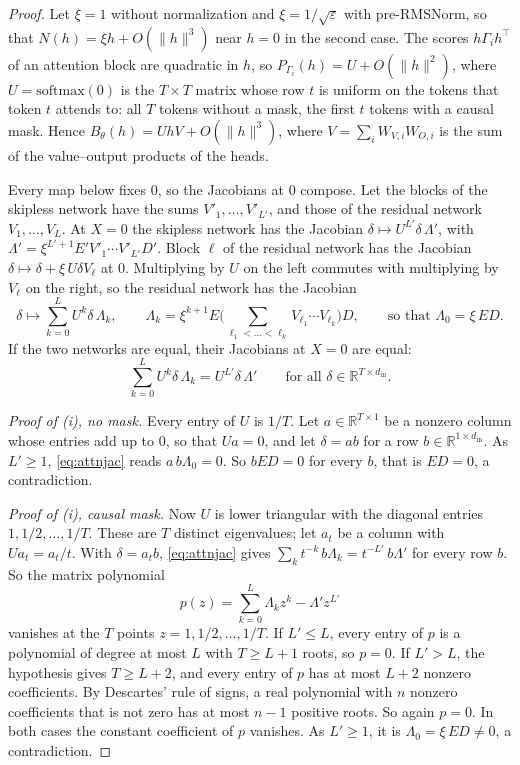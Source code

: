 \documentclass[10pt]{article}
\theoremstyle{definition}
\theoremstyle{remark}
\newcommand{\R}{\mathbb{R}}
\newcommand{\norm}[1]{\lVert #1\rVert}
\begin{document}
\begin{proof}
Let $\xi = 1$ without normalization and $\xi = 1/\sqrt{\varepsilon}$ with pre-RMSNorm, so that $N(h) = \xi h + O(\norm{h}^3)$ near $h = 0$ in the second case. The scores $h\Gamma_ih^\top$ of an attention block are quadratic in $h$, so $P_{\Gamma_i}(h) = U + O(\norm{h}^2)$, where $U = \mathrm{softmax}(0)$ is the $T\times T$ matrix whose row $t$ is uniform on the tokens that token $t$ attends to: all $T$ tokens without a mask, the first $t$ tokens with a causal mask. Hence $B_\theta(h) = UhV + O(\norm{h}^3)$, where $V = \sum_i W_{V,i}W_{O,i}$ is the sum of the value--output products of the heads.

Every map below fixes $0$, so the Jacobians at $0$ compose. Let the blocks of the skipless network have the sums $V'_1, \dots, V'_{L'}$, and those of the residual network $V_1, \dots, V_L$. At $X = 0$ the skipless network has the Jacobian $\delta \mapsto U^{L'}\delta\,\Lambda'$, with $\Lambda' = \xi^{L'+1}E'V'_1\cdots V'_{L'}D'$. Block $\ell$ of the residual network has the Jacobian $\delta \mapsto \delta + \xi\,U\delta V_\ell$ at $0$. Multiplying by $U$ on the left commutes with multiplying by $V_\ell$ on the right, so the residual network has the Jacobian
\[
\delta \mapsto \sum_{k=0}^{L} U^k\delta\,\Lambda_k, \qquad \Lambda_k = \xi^{k+1}E\Big(\sum_{\ell_1 < \dots < \ell_k} V_{\ell_1}\cdots V_{\ell_k}\Big)D, \qquad\text{so that } \Lambda_0 = \xi\,ED.
\]
If the two networks are equal, their Jacobians at $X = 0$ are equal:
\begin{equation}\label{eq:attnjac}
\sum_{k=0}^{L} U^k\delta\,\Lambda_k = U^{L'}\delta\,\Lambda' \qquad\text{for all } \delta \in \R^{T\times d_{\mathrm{in}}}.
\end{equation}

\emph{Proof of (i), no mask.} Every entry of $U$ is $1/T$. Let $a \in \R^{T\times 1}$ be a nonzero column whose entries add up to $0$, so that $Ua = 0$, and let $\delta = ab$ for a row $b \in \R^{1\times d_{\mathrm{in}}}$. As $L' \ge 1$, \cref{eq:attnjac} reads $a\,b\Lambda_0 = 0$. So $bED = 0$ for every $b$, that is $ED = 0$, a contradiction.

\emph{Proof of (i), causal mask.} Now $U$ is lower triangular with the diagonal entries $1, 1/2, \dots, 1/T$. These are $T$ distinct eigenvalues; let $a_t$ be a column with $Ua_t = a_t/t$. With $\delta = a_tb$, \cref{eq:attnjac} gives $\sum_k t^{-k}\,b\Lambda_k = t^{-L'}\,b\Lambda'$ for every row $b$. So the matrix polynomial
\[
p(z) = \sum_{k=0}^{L} \Lambda_kz^k - \Lambda'z^{L'}
\]
vanishes at the $T$ points $z = 1, 1/2, \dots, 1/T$. If $L' \le L$, every entry of $p$ is a polynomial of degree at most $L$ with $T \ge L + 1$ roots, so $p = 0$. If $L' > L$, the hypothesis gives $T \ge L + 2$, and every entry of $p$ has at most $L + 2$ nonzero coefficients. By Descartes' rule of signs, a real polynomial with $n$ nonzero coefficients that is not zero has at most $n - 1$ positive roots. So again $p = 0$. In both cases the constant coefficient of $p$ vanishes. As $L' \ge 1$, it is $\Lambda_0 = \xi\,ED \neq 0$, a contradiction.


\end{proof}
\end{document}
